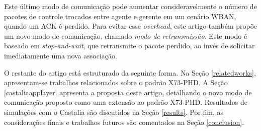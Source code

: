 Este último modo de comunicação pode aumentar consideravelmente o número de pacotes de controle trocados entre agente e gerente em um cenário WBAN, quando um ACK é perdido. Para evitar esse \textit{overhead}, este artigo também propõe um novo modo de comunicação, chamado \textit{modo de retransmissão}. Este modo é baseado em \textit{stop-and-wait}, que retransmite o pacote perdido, ao invés de solicitar imediatamente uma nova associação. 

O restante do artigo está estruturado da seguinte forma. Na Seção \ref{relatedworks}, apresentam-se trabalhos relacionados sobre o padrão X73-PHD. 
A Seção \ref{castaliaapplayer} apresenta a proposta deste artigo, detalhando o novo modo de comunicação proposto como uma extensão ao padrão X73-PHD. 
Resultados de simulações com o Castalia são discutidos na Seção \ref{results}. Por fim, as considerações finais e trabalhos futuros são comentados na Seção \ref{conclusion}.
